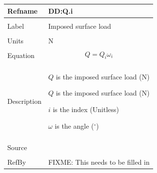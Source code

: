 \documentclass[12pt]{article}
\begin{document}
\noindent \begin{minipage}{\textwidth}
\begin{tabular}{p{} p{}}
\toprule \textbf{Refname} & \textbf{DD:Q.i}
\label{DD:Q.i}
\\ \midrule \\
Label & Imposed surface load
\\ \midrule \\
Units & N
\\ \midrule \\
Equation & \begin{dmath}
           Q=Q_{i} ω_{i}
           \end{dmath}
\\ \midrule \\
Description & \begin{symbDescription}
              \item{$Q$ is the imposed surface load (N)}
              \item{$Q$ is the imposed surface load (N)}
              \item{$i$ is the index (Unitless)}
              \item{$ω$ is the angle (${}^{\circ}$)}
              \end{symbDescription}
\\ \midrule \\
Source &
\\ \midrule \\
RefBy & FIXME: This needs to be filled in
\\ \bottomrule \end{tabular}
\end{minipage}\\
~\newline
\end{document}
